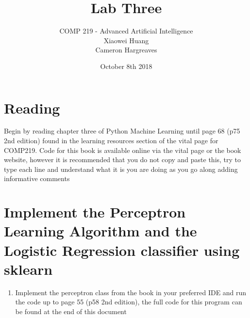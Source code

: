 \documentclass[12pt]{article}
\begin{document}


\date{October 8th 2018}
 
 
\title{Lab Three}%
\author{COMP 219 - Advanced Artificial Intelligence \\
		Xiaowei Huang \\ 
		Cameron Hargreaves\\}
 
\maketitle

\section{Reading}
Begin by reading chapter three of Python Machine Learning until page 68 (p75 2nd edition) found in the learning resources section of the vital page for COMP219. Code for this book is available online via the vital page or the book website, however it is recommended that you do not copy and paste this, try to type each line and understand what it is you are doing as you go along adding informative comments

\section{Implement the Perceptron Learning Algorithm and the Logistic Regression classifier using sklearn}
\begin{enumerate}
\item Implement the perceptron class from the book in your preferred IDE and run the code up to page 55 (p58 2nd edition), the full code for this program can be found at the end of this document 
\end{enumerate}
\end{document}
